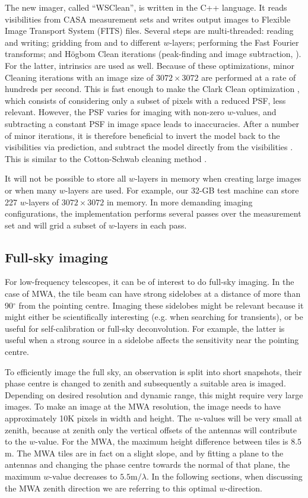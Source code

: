 \documentclass[useAMS,usenatbib]{mn2e}
\newcommand{\degree}{\ensuremath{^{\circ}}\xspace}
\begin{document}
The new imager, called ``WSClean'', is written in the C++ language. It reads visibilities from CASA measurement sets and writes output images to Flexible Image Transport System (FITS) files. Several steps are multi-threaded: reading and writing; gridding from and to different $w$-layers; performing the Fast Fourier transforms; and H\"ogbom Clean iterations (peak-finding and image subtraction, \citealt{hogbom-clean}). For the latter, intrinsics are used as well. Because of these optimizations, minor Cleaning iterations with an image size of $3072\times3072$ are performed at a rate of hundreds per second. This is fast enough to make the Clark Clean optimization \citep{clark-clean}, which consists of considering only a subset of pixels with a reduced PSF, less relevant. However, the PSF varies for imaging with non-zero $w$-values, and subtracting a constant PSF in image space leads to inaccuracies. After a number of minor iterations, it is therefore beneficial to invert the model back to the visibilities via prediction, and subtract the model directly from the visibilities \citep{wprojection-cornwell}. This is similar to the Cotton-Schwab cleaning method \citep{cotton-schwab-clean}.

It will not be possible to store all $w$-layers in memory when creating large images or when many $w$-layers are used. For example, our 32-GB test machine can store 227 $w$-layers of $3072\times3072$ in memory. In more demanding imaging configurations, the implementation performs several passes over the measurement set and will grid a subset of $w$-layers in each pass.

\subsection{Full-sky imaging}
For low-frequency telescopes, it can be of interest to do full-sky imaging. In the case of MWA, the tile beam can have strong sidelobes at a distance of more than 90\degree from the pointing centre. Imaging these sidelobes might be relevant because it might either be scientifically interesting (e.g. when searching for transients), or be useful for self-calibration or full-sky deconvolution. For example, the latter is useful when a strong source in a sidelobe affects the sensitivity near the pointing centre.

To efficiently image the full sky, an observation is split into short snapshots, their phase centre is changed to zenith and subsequently a suitable area is imaged. Depending on desired resolution and dynamic range, this might require very large images. To make an image at the MWA resolution, the image needs to have approximately 10K pixels in width and height. The $w$-values will be very small at zenith, because at zenith only the vertical offsets of the antennas will contribute to the $w$-value. For the MWA, the maximum height difference between tiles is $8.5$m. The MWA tiles are in fact on a slight slope, and by fitting a plane to the antennas and changing the phase centre towards the normal of that plane, the maximum $w$-value decreases to $5.5\textrm{m} / \lambda$. In the following sections, when discussing the MWA zenith direction we are referring to this optimal $w$-direction.
\end{document}
